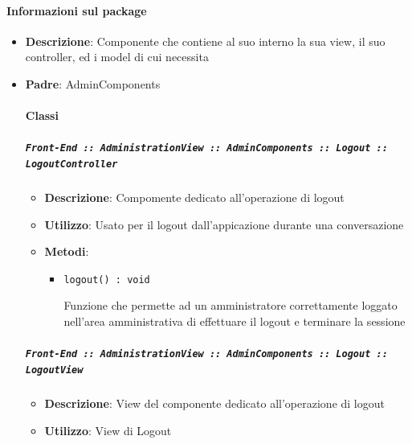 \documentclass[../DefinizioneDiProdotto.tex]{subfiles}
\begin{document}
	\paragraph{Informazioni sul package}\begin{itemize}\item \textbf{Descrizione}: Componente che contiene al suo interno la sua view, il suo controller, ed i model di cui necessita\item \textbf{Padre}: AdminComponents\paragraph{Classi}
	\subparagraph{\texttt{Front-End :: AdministrationView :: AdminComponents :: Logout :: LogoutController}}
	\begin{itemize}\item \textbf{Descrizione}: Compomente dedicato all'operazione di logout
	\item \textbf{Utilizzo}: Usato per il logout dall'appicazione durante una conversazione
	\item \textbf{Metodi}:
	\begin{itemize}
	\item \texttt{logout() : void}\

	 Funzione che permette ad un amministratore correttamente loggato nell'area amministrativa di effettuare il logout e terminare la sessione
	\end{itemize}\vspace{0.5em}
	\end{itemize}\subparagraph{\texttt{Front-End :: AdministrationView :: AdminComponents :: Logout :: LogoutView}}
	\begin{itemize}\item \textbf{Descrizione}: View del componente dedicato all'operazione di logout
	\item \textbf{Utilizzo}: View di Logout
	\end{itemize}\end{itemize}
\end{document}
